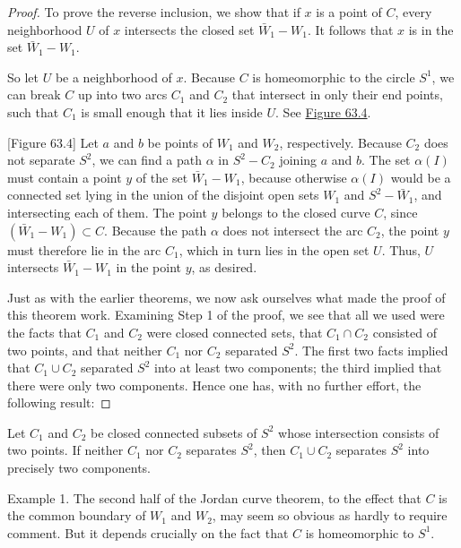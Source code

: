 \begin{proof}
To prove the reverse inclusion, we show that if \(x\) is a point of \(C\), every neighborhood \(U\) of \(x\) intersects the closed set \(\bar{W}_{1} - W_{1}\). It follows that \(x\) is in the set \(\bar{W}_{1} - W_{1}\).

So let \(U\) be a neighborhood of \(x\). Because \(C\) is homeomorphic to the circle \(S^{1}\), we can break \(C\) up into two arcs \(C_{1}\) and \(C_{2}\) that intersect in only their end points, such that \(C_{1}\) is small enough that it lies inside \(U\). See \hyperref[fig:63.4]{Figure 63.4}.

[Figure 63.4]
Let \(a\) and \(b\) be points of \(W_{1}\) and \(W_{2}\), respectively. Because \(C_{2}\) does not separate \(S^{2}\), we can find a path \(\alpha\) in \(S^{2} - C_{2}\) joining \(a\) and \(b\). The set \(\alpha ( I)\) must contain a point \(y\) of the set \(\bar{W}_{1} - W_{1}\), because otherwise \(\alpha ( I)\) would be a connected set lying in the union of the disjoint open sets \(W_{1}\) and \(S^{2} - \bar{W}_{1}\), and intersecting each of them. The point \(y\) belongs to the closed curve \(C\), since \(( {\bar{W}_{1} - W_{1}}) \subset C\). Because the path \(\alpha\) does not intersect the arc \(C_{2}\), the point \(y\) must therefore lie in the arc \(C_{1}\), which in turn lies in the open set \(U\). Thus, \(U\) intersects \(\bar{W}_{1} - W_{1}\) in the point \(y\), as desired.

Just as with the earlier theorems, we now ask ourselves what made the proof of this theorem work. Examining Step 1 of the proof, we see that all we used were the facts that \(C_{1}\) and \(C_{2}\) were closed connected sets, that \(C_{1} \cap {C}_{2}\) consisted of two points, and that neither \(C_{1}\) nor \(C_{2}\) separated \(S^{2}\). The first two facts implied that \(C_{1} \cup {C}_{2}\) separated \(S^{2}\) into at least two components; the third implied that there were only two components. Hence one has, with no further effort, the following result:
\end{proof}
\begin{theorem}
\label{thm:\thetheorem}
Let \(C_{1}\) and \(C_{2}\) be closed connected subsets of \(S^{2}\) whose intersection consists of two points. If neither \(C_{1}\) nor \(C_{2}\) separates \(S^{2}\), then \(C_{1} \cup {C}_{2}\) separates \(S^{2}\) into precisely two components.
\end{theorem}

Example 1. The second half of the Jordan curve theorem, to the effect that \(C\) is the common boundary of \(W_{1}\) and \(W_{2}\), may seem so obvious as hardly to require comment. But it depends crucially on the fact that \(C\) is homeomorphic to \(S^{1}\).


